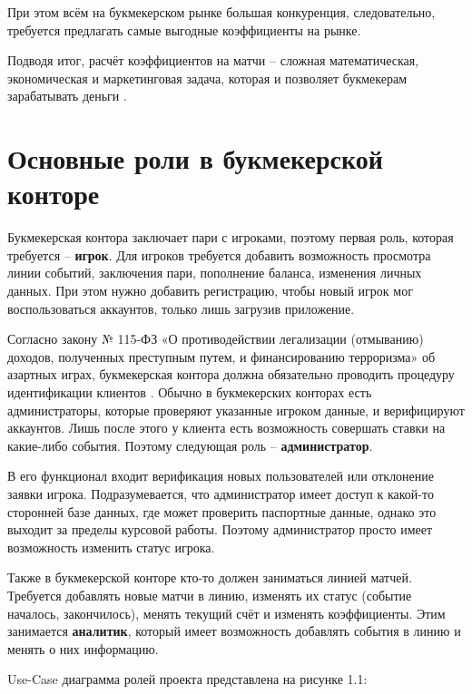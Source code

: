 При этом всём на букмекерском рынке большая конкуренция, следовательно, требуется предлагать самые выгодные коэффициенты на рынке.

Подводя итог, расчёт коэффициентов на матчи -- сложная математическая, экономическая и маркетинговая задача, которая и позволяет букмекерам зарабатывать деньги \cite{kfs}.

\section{Основные роли в букмекерской конторе}
Букмекерская контора заключает пари с игроками, поэтому первая роль, которая требуется -- \textbf{игрок}. 
Для игроков требуется добавить возможность просмотра линии событий, заключения пари, пополнение баланса, изменения личных данных.
При этом нужно добавить регистрацию, чтобы новый игрок мог воспользоваться аккаунтов, только лишь загрузив приложение. 

Согласно закону № 115-ФЗ «О противодействии легализации (отмыванию) доходов, полученных преступным путем, и финансированию терроризма» об азартных играх, букмекерская контора должна обязательно проводить процедуру идентификации клиентов \cite{bk2}. 
Обычно в букмекерских конторах есть администраторы, которые проверяют указанные игроком данные, и верифицируют аккаунтов. 
Лишь после этого у клиента есть возможность совершать ставки на какие-либо события.
Поэтому следующая роль -- \textbf{администратор}.

В его функционал входит верификация новых пользователей или отклонение заявки игрока.
Подразумевается, что администратор имеет доступ к какой-то сторонней базе данных, где может проверить паспортные данные, однако это выходит за пределы курсовой работы.
Поэтому администратор просто имеет возможность изменить статус игрока.

Также в букмекерской конторе кто-то должен заниматься линией матчей. 
Требуется добавлять новые матчи в линию, изменять их статус (событие началось, закончилось), менять текущий счёт и изменять коэффициенты.
Этим занимается \textbf{аналитик}, который имеет возможность добавлять события в линию и менять о них информацию.

Use-Case диаграмма ролей проекта представлена на рисунке 1.1:

